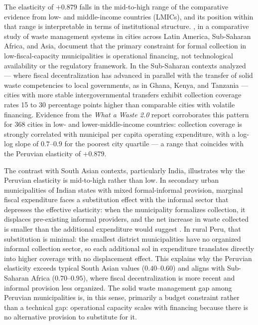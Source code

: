 The elasticity of $+0.879$ falls in the mid-to-high range of the comparative evidence from low- and middle-income countries (LMICs), and its position within that range is interpretable in terms of institutional structure.
\citet{Guerrero2013}, in a comparative study of waste management systems in cities across Latin America, Sub-Saharan Africa, and Asia, document that the primary constraint for formal collection in low-fiscal-capacity municipalities is operational financing, not technological availability or the regulatory framework.
In the Sub-Saharan contexts analyzed --- where fiscal decentralization has advanced in parallel with the transfer of solid waste competencies to local governments, as in Ghana, Kenya, and Tanzania --- cities with more stable intergovernmental transfers exhibit collection coverage rates 15 to 30 percentage points higher than comparable cities with volatile financing.
Evidence from the \textit{What a Waste 2.0} report \citep{Kaza2018} corroborates this pattern for 368 cities in low- and lower-middle-income countries: collection coverage is strongly correlated with municipal per capita operating expenditure, with a log-log slope of $0.7$--$0.9$ for the poorest city quartile --- a range that coincides with the Peruvian elasticity of $+0.879$.

The contrast with South Asian contexts, particularly India, illustrates why the Peruvian elasticity is mid-to-high rather than low.
In secondary urban municipalities of Indian states with mixed formal-informal provision, marginal fiscal expenditure faces a substitution effect with the informal sector that depresses the effective elasticity: when the municipality formalizes collection, it displaces pre-existing informal providers, and the net increase in waste collected is smaller than the additional expenditure would suggest \citep{Kaza2018}.
In rural Peru, that substitution is minimal: the smallest district municipalities have no organized informal collection sector, so each additional sol in expenditure translates directly into higher coverage with no displacement effect.
This explains why the Peruvian elasticity exceeds typical South Asian values ($0.40$--$0.60$) and aligns with Sub-Saharan Africa ($0.70$--$0.95$), where fiscal decentralization is more recent and informal provision less organized.
The solid waste management gap among Peruvian municipalities is, in this sense, primarily a budget constraint rather than a technical gap: operational capacity scales with financing because there is no alternative provision to substitute for it.

